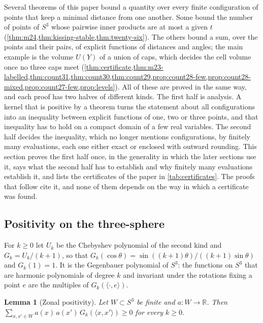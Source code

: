 \documentclass[11pt,reqno]{amsart}
\renewcommand{\_}{\origunderscore\allowbreak}
\numberwithin{equation}{section}
\theoremstyle{plain}
\newtheorem{lem}[thm]{Lemma}
\theoremstyle{definition}
\theoremstyle{remark}
\begin{document}
Several theorems of this paper bound a quantity over every finite
configuration of points that keep a minimal distance from one another.
Some bound the number of points of $S^3$ whose pairwise inner products are
at most a given $t$ (\cref{thm:m24,thm:kissing-stable,thm:twenty-six}).
The others bound a sum, over the points and their pairs, of explicit
functions of distances and angles; the main example is the volume $U(Y)$
of a union of caps, which decides the cell volume once no three caps meet
(\cref{thm:certificate,thm:m23-labelled,thm:count31,thm:count30,thm:count29,prop:count28-few,prop:count28-mixed,prop:count27-few,prop:levels}).
All of these are proved in the same way, and each proof has two halves of
different kinds. The first half is analysis. A kernel that is positive by
a theorem turns the statement about all configurations into an inequality
between explicit functions of one, two or three points, and that
inequality has to hold on a compact domain of a few real variables. The
second half decides the inequality, which no longer mentions
configurations, by finitely many evaluations, each one either exact or
enclosed with outward rounding. This section proves the first half once,
in the generality in which the later sections use it, says what the
second half has to establish and why finitely many evaluations establish
it, and lists the certificates of the paper in \cref{tab:certificates}.
The proofs that follow cite it, and none of them depends on the way in
which a certificate was found.

\subsection{Positivity on the three-sphere}\label{sec:kernels-positivity}

For $k\ge0$ let $U_k$ be the Chebyshev polynomial of the second kind and
$G_k=U_k/(k+1)$, so that
$G_k(\cos\theta)=\sin((k+1)\theta)/((k+1)\sin\theta)$ and $G_k(1)=1$. It
is the Gegenbauer polynomial of $S^3$: the functions on $S^3$ that are
harmonic polynomials of degree $k$ and invariant under the rotations
fixing a point $e$ are the multiples of $G_k(\langle\cdot,e\rangle)$.

\begin{lem}[Zonal positivity]\label{lem:zonal-psd}
Let $W\subset S^3$ be finite and $a\colon W\to\mathbb{R}$. Then
$\sum_{x,x'\in W}a(x)\,a(x')\,G_k(\langle x,x'\rangle)\ge0$ for every
$k\ge0$.
\end{lem}
\end{document}
